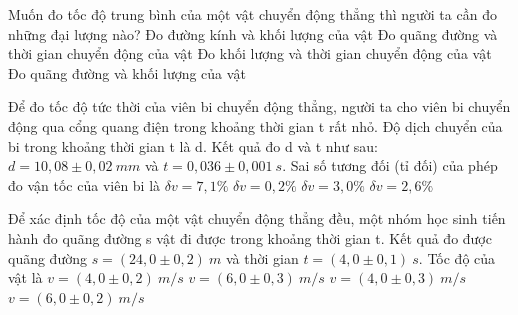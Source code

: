 \begin{ex}%
Muốn đo tốc độ trung bình của một vật chuyển động thẳng thì người ta cần đo những đại lượng nào?
\choice
{Đo đường kính và khối lượng của vật}
{\True Đo quãng đường và thời gian chuyển động của vật}
{Đo khối lượng và thời gian chuyển động của vật}
{Đo quãng đường và khối lượng của vật}
\loigiai{

}
 \end{ex}

\begin{ex}%
Để đo tốc độ tức thời của viên bi chuyển động thẳng, người ta cho viên bi chuyển động qua cổng quang điện trong khoảng thời gian t rất nhỏ. Độ dịch chuyển của bi trong khoảng thời gian t là d. Kết quả đo d và t như sau: $d=10,08 \pm 0,02\ mm$ và $t=0,036 \pm 0,001\ s$. Sai số tương đối (tỉ đối) của phép đo vận tốc của viên bi là
\choice
{$\delta v=7,1\%$}
{$\delta v=0,2\%$}
{\True $\delta v=3,0\%$}
{$\delta v=2,6\%$}
\loigiai{
}
 \end{ex}
\begin{ex}%
Để xác định tốc độ của một vật chuyển động thẳng đều, một nhóm học sinh tiến hành đo quãng đường s vật đi được trong khoảng thời gian t. Kết quả đo được quãng đường $s=(24,0 \pm 0,2)\ m$ và thời gian $t=(4,0 \pm 0,1)\ s$. Tốc độ của vật là
\choice
{$v=(4,0 \pm 0,2)\ m/s$}
{$v=(6,0 \pm 0,3)\ m/s$}
{$v=(4,0 \pm 0,3)\ m/s$}
{\True $v=(6,0 \pm 0,2)\ m/s$}
\loigiai{
}
 \end{ex}





